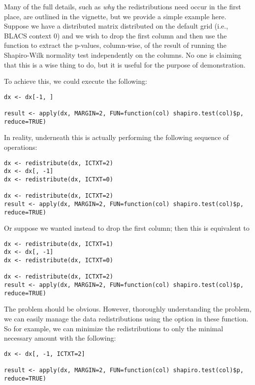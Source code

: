 Many of the full details, such as \emph{why} the redistributions need occur in the first place, are outlined in the  vignette, but we provide a simple example here.  Suppose we have a distributed matrix  distributed on the default grid (i.e., BLACS context 0) and we wish to drop the first column and then use the  function to extract the p-values, column-wise, of the result of running the Shapiro-Wilk normality test independently on the columns.  No one is claiming that this is a wise thing to do, but it is useful for the purpose of demonstration.

To achieve this, we could execute the following:

\begin{lstlisting}[language=rr,title=Implicit Redistributions]
dx <- dx[-1, ]

result <- apply(dx, MARGIN=2, FUN=function(col) shapiro.test(col)$p, reduce=TRUE)
\end{lstlisting}

In reality, underneath this is actually performing the following sequence of operations:

\begin{lstlisting}[language=rr,title=Implicit Redistributions]
dx <- redistribute(dx, ICTXT=2)
dx <- dx[, -1]
dx <- redistribute(dx, ICTXT=0)

dx <- redistribute(dx, ICTXT=2)
result <- apply(dx, MARGIN=2, FUN=function(col) shapiro.test(col)$p, reduce=TRUE)
\end{lstlisting}

Or suppose we wanted instead to drop the first column; then this is equivalent to

\begin{lstlisting}[language=rr,title=Implicit Redistributions]
dx <- redistribute(dx, ICTXT=1)
dx <- dx[, -1]
dx <- redistribute(dx, ICTXT=0)

dx <- redistribute(dx, ICTXT=2)
result <- apply(dx, MARGIN=2, FUN=function(col) shapiro.test(col)$p, reduce=TRUE)
\end{lstlisting}

The problem should be obvious.  However, thoroughly understanding the problem, we can easily manage the data redistributions using the  option in these function.  So for example, we can minimize the redistributions to only the minimal necessary amount with the following:

\begin{lstlisting}[language=rr,title=Implicit Redistributions]
dx <- dx[, -1, ICTXT=2]

result <- apply(dx, MARGIN=2, FUN=function(col) shapiro.test(col)$p, reduce=TRUE)
\end{lstlisting}

